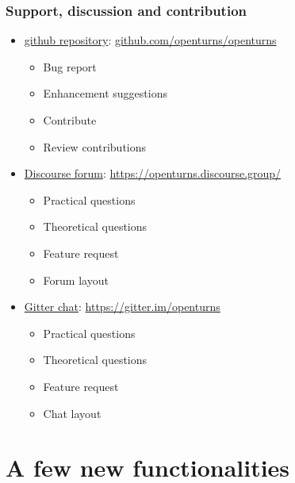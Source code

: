 \documentclass[aspectratio=169]{beamer}
\begin{document}
\begin{frame}[containsverbatim]
\frametitle{Support, discussion and contribution}

\small
\begin{itemize}
\item \underline{github repository}: \url{github.com/openturns/openturns}
\begin{itemize}
\item Bug report
\item Enhancement suggestions
\item Contribute
\item Review contributions
\end{itemize}

\item \underline{Discourse forum}: \url{https://openturns.discourse.group/}
\begin{itemize}
\item Practical questions
\item Theoretical questions
\item Feature request
\item Forum layout
\end{itemize}

\item \underline{Gitter chat}: \url{https://gitter.im/openturns}
\begin{itemize}
\item Practical questions
\item Theoretical questions
\item Feature request
\item Chat layout
\end{itemize}

\end{itemize}


\end{frame}






\section{A few new functionalities}

\end{document}
